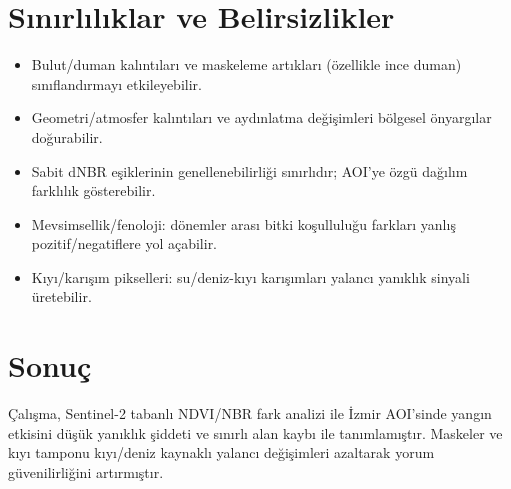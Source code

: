 \documentclass[11pt,a4paper]{article}
\begin{document}
\section{Sınırlılıklar ve Belirsizlikler}
\begin{itemize}
  \item Bulut/duman kalıntıları ve maskeleme artıkları (özellikle ince duman) sınıflandırmayı etkileyebilir.
  \item Geometri/atmosfer kalıntıları ve aydınlatma değişimleri bölgesel önyargılar doğurabilir.
  \item Sabit dNBR eşiklerinin genellenebilirliği sınırlıdır; AOI'ye özgü dağılım farklılık gösterebilir.
  \item Mevsimsellik/fenoloji: dönemler arası bitki koşulluluğu farkları yanlış pozitif/negatiflere yol açabilir.
  \item Kıyı/karışım pikselleri: su/deniz-kıyı karışımları yalancı yanıklık sinyali üretebilir.
\end{itemize}
\section{Sonuç}
Çalışma, Sentinel-2 tabanlı NDVI/NBR fark analizi ile İzmir AOI'sinde yangın etkisini düşük yanıklık şiddeti ve sınırlı alan kaybı ile tanımlamıştır. Maskeler ve kıyı tamponu kıyı/deniz kaynaklı yalancı değişimleri azaltarak yorum güvenilirliğini artırmıştır. 
\end{document}
